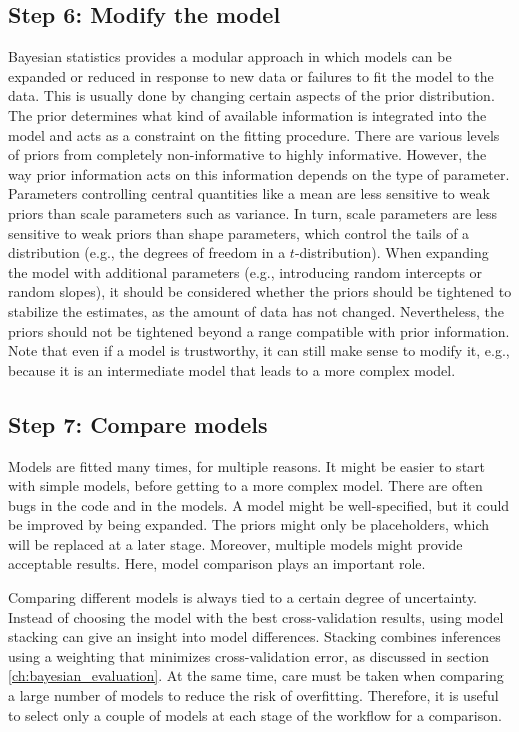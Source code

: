 \subsection{Step 6: Modify the model}

Bayesian statistics provides a modular approach in which models can be expanded or reduced in response to new data or failures to fit the model to the data.
This is usually done by changing certain aspects of the prior distribution.
The prior determines what kind of available information is integrated into the model and acts as a constraint on the fitting procedure.
There are various levels of priors from completely non-informative to highly informative.
However, the way prior information acts on this information depends on the type of parameter.
Parameters controlling central quantities like a mean are less sensitive to weak priors than scale parameters such as variance.
In turn, scale parameters are less sensitive to weak priors than shape parameters, which control the tails of a distribution (e.g., the degrees of freedom in a $t$-distribution).
When expanding the model with additional parameters (e.g., introducing random intercepts or random slopes), it should be considered whether the priors should be tightened to stabilize the estimates, as the amount of data has not changed.
Nevertheless, the priors should not be tightened beyond a range compatible with prior information.
Note that even if a model is trustworthy, it can still make sense to modify it, e.g., because it is an intermediate model that leads to a more complex model.

\subsection{Step 7: Compare models}

Models are fitted many times, for multiple reasons.
It might be easier to start with simple models, before getting to a more complex model. There are often bugs in the code and in the models.
A model might be well-specified, but it could be improved by being expanded.
The priors might only be placeholders, which will be replaced at a later stage.
Moreover, multiple models might provide acceptable results.
Here, model comparison plays an important role.

Comparing different models is always tied to a certain degree of uncertainty.
Instead of choosing the model with the best cross-validation results, using model stacking can give an insight into model differences.
Stacking combines inferences using a weighting that minimizes cross-validation error, as discussed in section \ref{ch:bayesian_evaluation}.
At the same time, care must be taken when comparing a large number of models to reduce the risk of overfitting.
Therefore, it is useful to select only a couple of models at each stage of the workflow for a comparison.
